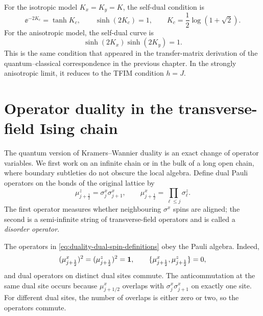 For the isotropic model $K_x=K_y=K$, the self-dual condition is
\begin{equation}
\label{eq:duality-isotropic-ising-critical}
    \ee^{-2K_c}=\tanh K_c,
    \qquad
    \sinh(2K_c)=1,
    \qquad
    K_c=\frac12\log(1+\sqrt2).
\end{equation}
For the anisotropic model, the self-dual curve is
\begin{equation}
\label{eq:duality-anisotropic-ising-critical}
    \sinh(2K_x)\sinh(2K_y)=1 .
\end{equation}
This is the same condition that appeared in the transfer-matrix derivation of
the quantum--classical correspondence in the previous chapter.
In the strongly anisotropic limit, it reduces to the TFIM condition $h=J$.

\section{Operator duality in the transverse-field Ising chain}
\label{sec:operator-duality-tfim}

The quantum version of Kramers--Wannier duality is an exact change of operator
variables.  We first work on an infinite chain or in the bulk of a long open
chain, where boundary subtleties do not obscure the local algebra.  Define dual
Pauli operators on the bonds of the original lattice by
\begin{equation}
\label{eq:duality-dual-spin-definitions}
    \mu_{j+\frac12}^z
    =
    \sigma_j^x\sigma_{j+1}^x,
    \qquad
    \mu_{j+\frac12}^x
    =
    \prod_{\ell\leq j}\sigma_\ell^z .
\end{equation}
The first operator measures whether neighbouring $\sigma^x$ spins are aligned;
the second is a semi-infinite string of transverse-field operators and is called
a \emph{disorder operator}.

The operators in \cref{eq:duality-dual-spin-definitions} obey the Pauli algebra.
Indeed,
\begin{equation}
\label{eq:duality-mu-pauli-algebra}
    (\mu_{j+\frac12}^x)^2=(\mu_{j+\frac12}^z)^2=\mathbf{1},
    \qquad
    \{\mu_{j+\frac12}^x,\mu_{j+\frac12}^z\}=0,
\end{equation}
and dual operators on distinct dual sites commute.  The anticommutation at the
same dual site occurs because $\mu_{j+1/2}^x$ overlaps with
$\sigma_j^x\sigma_{j+1}^x$ on exactly one site.  For different dual sites, the
number of overlaps is either zero or two, so the operators commute.


